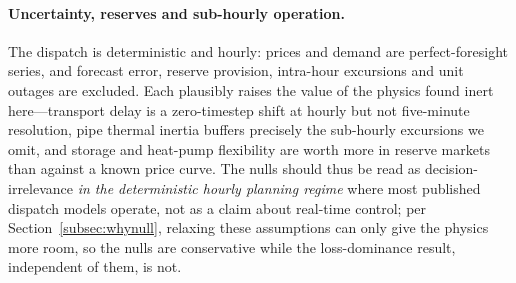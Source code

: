 
\paragraph{Uncertainty, reserves and sub-hourly operation.}
The dispatch is deterministic and hourly: prices and demand are perfect-foresight series,
and forecast error, reserve provision, intra-hour excursions and unit outages are excluded.
Each plausibly raises the value of the physics found inert here---transport delay is a
zero-timestep shift at hourly but not five-minute resolution, pipe thermal inertia buffers
precisely the sub-hourly excursions we omit, and storage and heat-pump flexibility are worth
more in reserve markets than against a known price curve. The nulls should thus be read as
decision-irrelevance \emph{in the deterministic hourly planning regime} where most published
dispatch models operate, not as a claim about real-time control; per
Section~\ref{subsec:whynull}, relaxing these assumptions can only give the physics more room,
so the nulls are conservative while the loss-dominance result, independent of them, is not.

